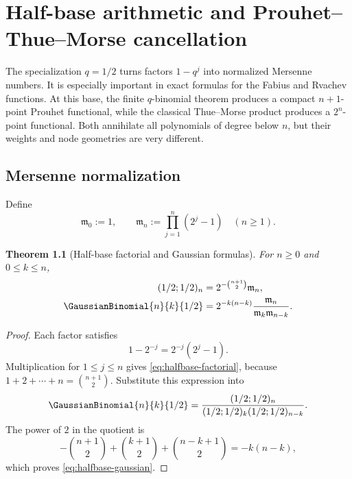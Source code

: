 \documentclass[11pt,a4paper,oneside,openany]{book}
\newtheorem{theorem}{Theorem}[chapter]
\theoremstyle{definition}
\theoremstyle{remark}
\begin{document}
\chapter{Half-base arithmetic and Prouhet--Thue--Morse cancellation}\label{chap:halfbase-thuemorse}

The specialization $q=1/2$ turns factors $1-q^j$ into normalized Mersenne numbers.  It is especially important in exact formulas for the Fabius and Rvachev functions.  At this base, the finite $q$-binomial theorem produces a compact $n+1$-point Prouhet functional, while the classical Thue--Morse product produces a $2^n$-point functional.  Both annihilate all polynomials of degree below $n$, but their weights and node geometries are very different.

\section{Mersenne normalization}

Define
\begin{equation}\label{eq:mersenne-product}
 \mathfrak m_0:=1,
 \qquad
 \mathfrak m_n:=\prod_{j=1}^{n}(2^j-1)
 \quad(n\ge1).
\end{equation}

\begin{theorem}[Half-base factorial and Gaussian formulas]\label{thm:halfbase-normalization}
For $n\ge0$ and $0\le k\le n$,
\begin{align}
 (1/2;1/2)_n
 &=2^{-\binom{n+1}{2}}\mathfrak m_n,
 \label{eq:halfbase-factorial}\\
 \GaussianBinomial{n}{k}{1/2}
 &=2^{-k(n-k)}
   \frac{\mathfrak m_n}{\mathfrak m_k\mathfrak m_{n-k}}.
 \label{eq:halfbase-gaussian}
\end{align}
\end{theorem}

\begin{proof}
Each factor satisfies
\[
 1-2^{-j}=2^{-j}(2^j-1).
\]
Multiplication for $1\le j\le n$ gives \eqref{eq:halfbase-factorial}, because
$1+2+\cdots+n=\binom{n+1}{2}$.  Substitute this expression into
\[
 \GaussianBinomial{n}{k}{1/2}
 =\frac{(1/2;1/2)_n}{(1/2;1/2)_k(1/2;1/2)_{n-k}}.
\]
The power of $2$ in the quotient is
\[
 -\binom{n+1}{2}+\binom{k+1}{2}+\binom{n-k+1}{2}
 =-k(n-k),
\]
which proves \eqref{eq:halfbase-gaussian}.
\end{proof}
\end{document}
